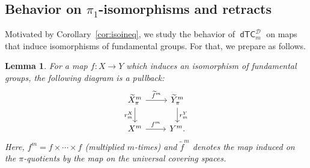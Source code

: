 \documentclass[amscd,amssymb,verbatim,11pt]{amsart}
\theoremstyle{plain}
\newtheorem{lemma}[thm]{Lemma}
\theoremstyle{definition}
\newcommand{\Wi}{\widetilde}
\DeclareMathOperator{\dTC}{{\mathsf{dTC}}}
\newcommand{\D}{\mathcal{D}}
\begin{document}
\subsection{Behavior on $\pi_1$-isomorphisms and retracts}
Motivated by Corollary~\ref{cor:isoineq}, we study the behavior of $\dTC^{\D}_m$ on maps that induce isomorphisms of fundamental groups. For that, we prepare as follows.
\begin{lemma}\label{lem:diagpull}
For a map $f\colon X \to Y$ which induces an isomorphism of fundamental groups, the following diagram is a pullback:
\[
\begin{tikzcd}
    \Wi{X}^m_\pi \arrow{r}{\Wi{f}^m} \arrow{d}[swap]{r^X_m}
    &
    \Wi{Y}^m_\pi \arrow{d}{r^Y_m}
    \\
    X^m\arrow{r}{f^m}
    & 
    Y^m.
\end{tikzcd}
\]
Here, $f^m=f\times\cdots\times f$ (multiplied $m$-times) and $\Wi{f}^m$ denotes the map induced on the $\pi$-quotients by the map on the universal covering spaces.
\end{lemma}
\end{document}
